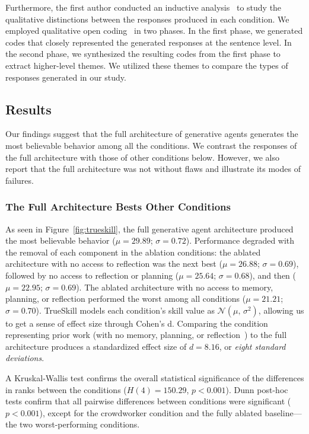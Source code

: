 Furthermore, the first author conducted an inductive analysis~\cite{18_thomas2006general} to study the qualitative distinctions between the responses produced in each condition. We employed qualitative open coding~\cite{78_open_coding} in two phases. In the first phase, we generated codes that closely represented the generated responses at the sentence level. In the second phase, we synthesized the resulting codes from the first phase to extract higher-level themes. We utilized these themes to compare the types of responses generated in our study.



\subsection{Results}
Our findings suggest that the full architecture of generative agents generates the most believable behavior among all the conditions. We contrast the responses of the full architecture with those of other conditions below. However, we also report that the full architecture was not without flaws and illustrate its modes of failures.

\subsubsection{The Full Architecture Bests Other Conditions} 
As seen in Figure~\ref{fig:trueskill}, the full generative agent architecture produced the most believable behavior ($\mu=29.89$; $\sigma=0.72$). Performance degraded with the removal of each component in the ablation conditions: the ablated architecture with no access to reflection was the next best ($\mu=26.88$; $\sigma=0.69$), followed by no access to reflection or planning ($\mu=25.64$; $\sigma=0.68$), and then  ($\mu=22.95$; $\sigma=0.69$). The ablated architecture with no access to memory, planning, or reflection performed the worst among all conditions ($\mu=21.21$; $\sigma=0.70$). TrueSkill models each condition's skill value as $\mathcal{N}(\mu,\,\sigma^{2})$, allowing us to get a sense of effect size through Cohen's d. Comparing the condition representing prior work (with no memory, planning, or reflection~\cite{9_park2022socialsimulacra,binz2023using,63_horton2023large}) to the full architecture produces a standardized effect size of $d=8.16$, or \textit{eight standard deviations}. 

A Kruskal-Wallis test confirms the overall statistical significance of the differences in ranks between the conditions ($H(4)=150.29$, $p<0.001$). Dunn post-hoc tests confirm that all pairwise differences between conditions were significant ($p<0.001$), except for the crowdworker condition and the fully ablated baseline---the two worst-performing conditions.

